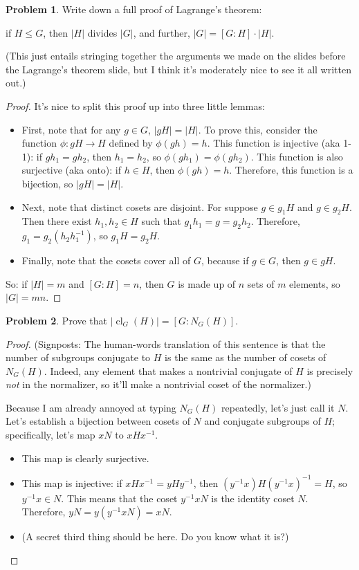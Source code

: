 \documentclass[12pt]{article}
\theoremstyle{definition} %
\newtheorem{problem}{Problem}
\newcommand\inv{^{-1}} %
\begin{document}
\begin{problem}
    Write down a full proof of Lagrange's theorem: 
    
    \begin{center}
        if $H\leq G$, then $|H|$ divides $|G|$, and further, $|G| = [G:H]\cdot |H|$.
    \end{center}
    
    (This just entails stringing together the arguments we made on the slides before the Lagrange's theorem slide, but I think it's moderately nice to see it all written out.)

    \begin{proof}
        It's nice to split this proof up into three little lemmas:
        \begin{itemize}
            \item First, note that for any $g\in G$, $|gH| = |H|$. To prove this, consider the function $\phi:gH \to H$ defined by $\phi(gh) = h$. This function is injective (aka 1-1): if $gh_1 = gh_2$, then $h_1 = h_2$, so $\phi(gh_1) = \phi(gh_2)$. This function is also surjective (aka onto): if $h\in H$, then $\phi(gh) = h$. Therefore, this function is a bijection, so $|gH| = |H|$.
            \item Next, note that distinct cosets are disjoint. For suppose $g\in g_1H$ and $g\in g_2H$. Then there exist $h_1, h_2\in H$ such that $g_1h_1 = g = g_2h_2$. Therefore, $g_1 = g_2(h_2 h_1\inv)$, so $g_1H = g_2H$.
            \item Finally, note that the cosets cover all of $G$, because if $g\in G$, then $g\in gH$.
        \end{itemize}
        So: if $|H| = m$ and $[G:H]=n$, then $G$ is made up of $n$ sets of $m$ elements, so $|G| = mn$.
    \end{proof}
\end{problem}
\begin{problem}
    Prove that $|\operatorname{cl}_G(H)| = [G:N_G(H)]$.
    \begin{proof}
        (Signposts: The human-words translation of this sentence is that the number of subgroups conjugate to $H$ is the same as the number of cosets of $N_G(H)$. Indeed, any element that makes a nontrivial conjugate of $H$ is precisely \textit{not} in the normalizer, so it'll make a nontrivial coset of the normalizer.) 
        
        Because I am already annoyed at typing $N_G(H)$ repeatedly, let's just call it $N$. Let's establish a bijection between cosets of $N$ and conjugate subgroups of $H$; specifically, let's map $xN$ to $xHx\inv$. 
        \begin{itemize}
            \item This map is clearly surjective.
            \item This map is injective: if $xHx\inv = yHy\inv$, then $(y\inv x) H (y\inv x)\inv = H$, so $y\inv x \in N$. This means that the coset $y\inv x N$ is the identity coset $N$. Therefore, $yN = y\left(y\inv xN\right) = xN$.
            \item (A secret third thing should be here. Do you know what it is?)
        \end{itemize}
    \end{proof}
\end{problem}
\end{document}

